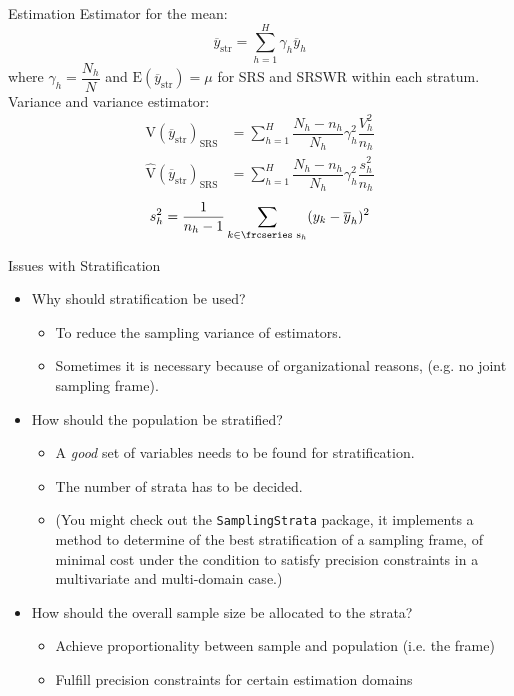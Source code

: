 \documentclass[10pt]{beamer}\usepackage[]{graphicx}\usepackage[]{color}
\newcommand{\textfrc}[1]{{\frcseries#1}}
\newcommand{\mathfrc}[1]{\text{\textfrc{#1}}}
\newcommand{\E}[1]{\text{E}\left(#1\right)}
\newcommand{\V}[1]{\text{V}\left(#1\right)}
\newcommand{\Vest}[1]{\widehat{\text{V}}\left(#1\right)}
\begin{document}
\begin{frame}{Estimation}
  Estimator for the mean:
  \begin{equation*}
  \overline{y}_{\text{str}} = \sum_{h=1}^H \gamma_h \overline{y}_h
  \end{equation*}
  where $\gamma_h = \dfrac{N_h}{N}$ and $\E{\overline{y}_{\text{str}}} = \mu$ for SRS and SRSWR within each stratum.
  \newline
  Variance and variance estimator:
  \begin{align*}
  \V{\overline{y}_{\text{str}}}_{\text{SRS}} & = \sum_{h=1}^H \dfrac{N_h-n_h}{N_h} \gamma_h^2 \dfrac{V_{h}^2}{n_h} \\
  \Vest{\overline{y}_{\text{str}}}_{\text{SRS}} & = \sum_{h=1}^H \dfrac{N_h-n_h}{N_h} \gamma_h^2 \dfrac{s_{h}^2}{n_h} 
  \end{align*}
  \begin{equation*}
  s^2_{h} = \dfrac{1}{n_h-1} \sum_{k \in \mathfrc{s}_h} (y_k - \overline{y}_h)^2
  \end{equation*}

\end{frame}


\begin{frame}{Issues with Stratification}
\begin{itemize}
\item<1-> Why should stratification be used?
\begin{itemize}
\item<2-> To reduce the sampling variance of estimators.
\item<2-> Sometimes it is necessary because of organizational reasons, (e.g. no joint sampling frame).
\end{itemize}
\item<3-> How should the population be stratified?
\begin{itemize}
\item<4-> A \emph{good} set of variables needs to be found for stratification.
\item<4-> The number of strata has to be decided.
\item<5-> (You might check out the \texttt{SamplingStrata} package, it 
implements a method to determine of the best stratification of a sampling frame,
of minimal cost under the condition to satisfy precision constraints in a multivariate and multi-domain case.)
\end{itemize}
\item<6-> How should the overall sample size be allocated to the strata?
\begin{itemize}
\item<7-> Achieve proportionality between sample and population (i.e. the frame)
\item<7-> Fulfill precision constraints for certain estimation domains
\end{itemize}
\end{itemize}

\end{frame}
\end{document}
